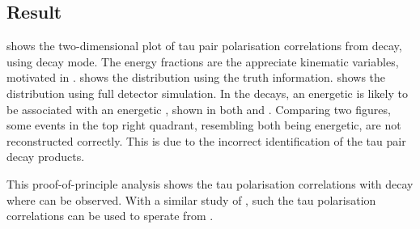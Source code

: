 \subsection{Result}

 shows the two-dimensional plot of tau pair polarisation correlations from \PZ decay, using \tauToPion decay mode. The energy fractions are the appreciate kinematic variables, motivated in .  shows the distribution using the truth information.  shows the distribution using full detector simulation. In the \ZToTauTau decays, an energetic \Ppipm is likely to be associated with an energetic \Ppipm, shown in both  and . Comparing two figures, some events in the top right quadrant, resembling both \Ppipm being energetic, are not reconstructed correctly. This is due to the incorrect identification of the tau pair decay products.

This proof-of-principle analysis shows the tau polarisation correlations with \ZToTauTau decay where \tauToPion can be observed. With a similar study of \HiggsToTauTau, such  the tau polarisation correlations can be used to sperate \PHiggs from \PZ.


